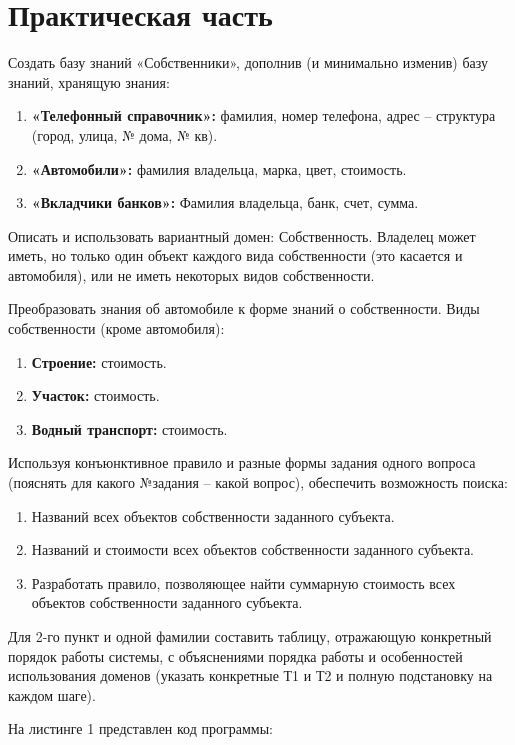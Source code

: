 \chapter*{Практическая часть}

Создать базу знаний «Собственники», дополнив (и минимально изменив) базу знаний, хранящую знания:
\begin{enumerate}
	\item \textbf{«Телефонный справочник»:} фамилия, номер телефона, адрес – структура (город, улица, № дома, № кв).
	\item \textbf{«Автомобили»:} фамилия владельца, марка, цвет, стоимость.
	\item \textbf{«Вкладчики банков»:} Фамилия владельца, банк, счет, сумма.
\end{enumerate}

Описать и использовать вариантный домен: Собственность. 
Владелец может иметь, но только один объект каждого вида собственности (это касается и автомобиля), 
или не иметь некоторых видов собственности.

Преобразовать знания об автомобиле к форме знаний о собственности.
Виды собственности (кроме автомобиля):
\begin{enumerate}
	\item \textbf{Строение:} стоимость.
	\item \textbf{Участок:} стоимость.
	\item \textbf{Водный транспорт:} стоимость.
\end{enumerate}

Используя конъюнктивное правило и разные формы задания одного вопроса (пояснять для какого №задания – какой вопрос), обеспечить возможность поиска:

\begin{enumerate}
	\item Названий всех объектов собственности заданного субъекта.
	\item Названий и стоимости всех объектов собственности заданного субъекта.
	\item Разработать правило, позволяющее найти суммарную стоимость всех объектов собственности заданного субъекта.
\end{enumerate}

Для 2-го пункт и одной фамилии составить таблицу, отражающую конкретный порядок работы системы, с объяснениями порядка работы и особенностей использования
доменов (указать конкретные Т1 и Т2 и полную подстановку на каждом шаге).

На листинге 1 представлен код программы:

